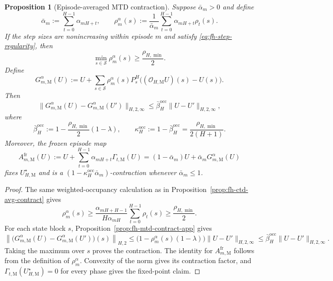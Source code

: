 \documentclass{article}
\newtheorem{proposition}[theorem]{Proposition}
\newcommand{\X}{\mathcal{S}}
\begin{document}
\begin{proposition}[Episode-averaged MTD contraction]
\label{prop:fh-mtd-avg-contract}
Suppose $\bar\alpha_m>0$ and define
\begin{equation}
\bar\alpha_m:=\sum_{t=0}^{H-1}\alpha_{mH+t},\qquad \rho_m^\alpha(s):=\frac{1}{\bar\alpha_m}\sum_{t=0}^{H-1}\alpha_{mH+t}\rho_t(s).
\end{equation}
If the step sizes are nonincreasing within episode $m$ and satisfy \eqref{eq:fh-step-regularity}, then
\begin{equation}
\min_{s\in\X}\rho_m^\alpha(s)\ge\frac{\rho_{H,\min}}{2}.
\end{equation}
Define
\begin{equation}
G_{m,\mathrm M}^\alpha(U):=U+\sum_{s\in\X}\rho_m^\alpha(s)P_s^H\bigl((\mathcal O_{H,\mathrm M}U)(s)-U(s)\bigr).
\end{equation}
Then
\begin{equation}
\lVert G_{m,\mathrm M}^\alpha(U)-G_{m,\mathrm M}^\alpha(U')\rVert_{H,2,\infty}\le\bar\beta_H^{\mathrm{occ}}\lVert U-U'\rVert_{H,2,\infty},
\end{equation}
where
\begin{equation}
\bar\beta_H^{\mathrm{occ}}:=1-\frac{\rho_{H,\min}}{2}(1-\lambda),\qquad \kappa_H^{\mathrm{occ}}:=1-\bar\beta_H^{\mathrm{occ}}=\frac{\rho_{H,\min}}{2(H+1)}.
\end{equation}
Moreover, the frozen episode map
\begin{equation}
A_{m,\mathrm M}^{\mathrm{fr}}(U):=U+\sum_{t=0}^{H-1}\alpha_{mH+t}\Gamma_{t,\mathrm M}(U)=(1-\bar\alpha_m)U+\bar\alpha_mG_{m,\mathrm M}^\alpha(U)
\end{equation}
fixes $U_{H,\mathrm M}^\star$ and is a $(1-\kappa_H^{\mathrm{occ}}\bar\alpha_m)$-contraction whenever $\bar\alpha_m\le1$.
\end{proposition}

\begin{proof}
The same weighted-occupancy calculation as in Proposition~\ref{prop:fh-ctd-avg-contract} gives
\begin{equation}
\rho_m^\alpha(s)\ge\frac{\alpha_{mH+H-1}}{H\alpha_{mH}}\sum_{t=0}^{H-1}\rho_t(s)\ge\frac{\rho_{H,\min}}{2}.
\end{equation}
For each state block $s$, Proposition~\ref{prop:fh-mtd-contract-app} gives
\begin{equation}
\left\lVert\bigl(G_{m,\mathrm M}^\alpha(U)-G_{m,\mathrm M}^\alpha(U')\bigr)(s)\right\rVert_{H,2}\le\bigl(1-\rho_m^\alpha(s)(1-\lambda)\bigr)\lVert U-U'\rVert_{H,2,\infty}\le\bar\beta_H^{\mathrm{occ}}\lVert U-U'\rVert_{H,2,\infty}.
\end{equation}
Taking the maximum over $s$ proves the contraction. The identity for $A_{m,\mathrm M}^{\mathrm{fr}}$ follows from the definition of $\rho_m^\alpha$. Convexity of the norm gives its contraction factor, and $\Gamma_{t,\mathrm M}(U_{H,\mathrm M}^\star)=0$ for every phase gives the fixed-point claim.
\end{proof}
\end{document}
